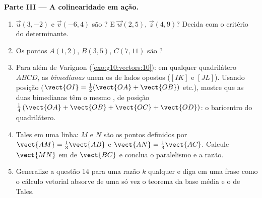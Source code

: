 \begin{problem}
\medskip
\noindent\textbf{Parte III --- A colinearidade em ação.}
\begin{enumerate}[resume]
  \item $\vec u(3, -2)$ e $\vec v(-6, 4)$ são ? E
        $\vec w(2, 5)$, $\vec z(4, 9)$? Decida com o critério do
        determinante.
  \item Os pontos $A(1, 2)$, $B(3, 5)$, $C(7, 11)$ são
        ?
  \item Para além de Varignon (\cref{exo:g10:vectors:10}): em
        qualquer quadrilátero $ABCD$, as \emph{bimedianas} unem
        os  de lados opostos ($[IK]$ e $[JL]$).
        Usando  posição ($\vect{OI} = \frac12(\vect{OA} +
        \vect{OB})$ etc.), mostre que as duas bimedianas têm o
        mesmo , de  posição
        $\frac14\left(\vect{OA} + \vect{OB} + \vect{OC} +
        \vect{OD}\right)$: o baricentro do quadrilátero.
  \item Tales em uma linha: $M$ e $N$ são os pontos definidos por
        $\vect{AM} = \frac13\vect{AB}$ e
        $\vect{AN} = \frac13\vect{AC}$. Calcule $\vect{MN}$ em
         de $\vect{BC}$ e conclua o paralelismo e a razão.
  \item Generalize a questão 14 para uma razão $k$ qualquer e
        diga em uma frase como o cálculo vetorial absorve de uma
        só vez o teorema da base média e o de Tales.
\end{enumerate}


\end{problem}

